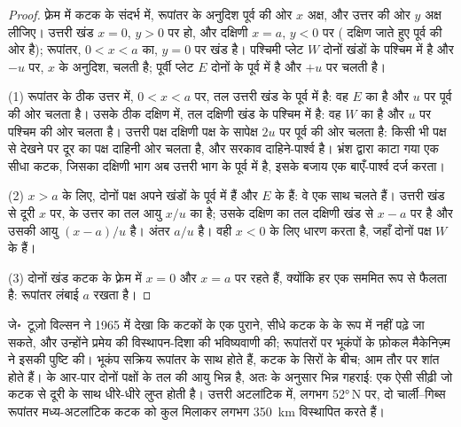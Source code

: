 \begin{proof}
फ़्रेम में कटक के संदर्भ में, रूपांतर के अनुदिश पूर्व की ओर $x$ अक्ष, और उत्तर की ओर $y$ अक्ष लीजिए। उत्तरी खंड $x = 0$, $y > 0$ पर हो, और दक्षिणी $x = a$, $y < 0$ पर ( दक्षिण जाते हुए पूर्व की ओर है); रूपांतर, $0 < x < a$ का, $y = 0$ पर खंड है। पश्चिमी प्लेट $W$ दोनों खंडों के पश्चिम में है और $-u$ पर, $x$ के अनुदिश, चलती है; पूर्वी प्लेट $E$ दोनों के पूर्व में है और $+u$ पर चलती है।

(1) रूपांतर के ठीक उत्तर में, $0 < x < a$ पर, तल उत्तरी खंड के पूर्व में है: वह $E$ का है और $u$ पर पूर्व की ओर चलता है। उसके ठीक दक्षिण में, तल दक्षिणी खंड के पश्चिम में है: वह $W$ का है और $u$ पर पश्चिम की ओर चलता है। उत्तरी पक्ष दक्षिणी पक्ष के सापेक्ष $2u$ पर पूर्व की ओर चलता है: किसी भी पक्ष से देखने पर दूर का पक्ष दाहिनी ओर चलता है, और सरकाव दाहिने-पार्श्व है। भ्रंश द्वारा काटा गया एक सीधा कटक, जिसका दक्षिणी भाग अब उत्तरी भाग के पूर्व में है, इसके बजाय एक बाएँ-पार्श्व  दर्ज करता।

(2) $x > a$ के लिए, दोनों पक्ष अपने खंडों के पूर्व में हैं और $E$ के हैं: वे एक साथ चलते हैं। उत्तरी खंड से दूरी $x$ पर,  के उत्तर का तल आयु $x/u$ का है; उसके दक्षिण का तल दक्षिणी खंड से $x - a$ पर है और उसकी आयु $(x - a)/u$ है। अंतर $a/u$ है। वही $x < 0$ के लिए धारण करता है, जहाँ दोनों पक्ष $W$ के हैं।

(3) दोनों खंड कटक के फ़्रेम में $x = 0$ और $x = a$ पर रहते हैं, क्योंकि हर एक सममित रूप से फैलता है: रूपांतर लंबाई $a$ रखता है।
\end{proof}

जे॰\ टूज़ो विल्सन ने 1965 में देखा कि कटकों के  एक पुराने, सीधे कटक के  के रूप में नहीं पढ़े जा सकते, और उन्होंने प्रमेय की विस्थापन-दिशा की भविष्यवाणी की; रूपांतरों पर भूकंपों के फ़ोकल मैकेनिज़्म ने इसकी पुष्टि की। भूकंप सक्रिय रूपांतर के साथ होते हैं, कटक के सिरों के बीच;  आम तौर पर शांत होते हैं।  के आर-पार दोनों पक्षों के तल की आयु भिन्न है, अतः  के अनुसार भिन्न गहराई: एक ऐसी सीढ़ी जो कटक से दूरी के साथ धीरे-धीरे लुप्त होती है। उत्तरी अटलांटिक में, लगभग \ang{52}\,N पर, दो चार्ली–गिब्स रूपांतर मध्य-अटलांटिक कटक को कुल मिलाकर लगभग \qty{350}{km} विस्थापित करते हैं।

